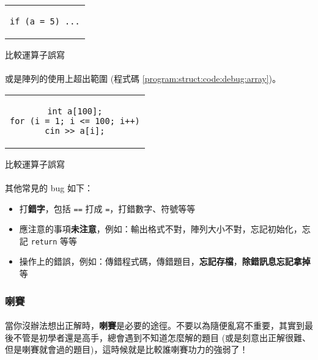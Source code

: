 \documentclass[12pt,a4paper,oneside]{report}
\begin{document}
\begin{CJK}{UTF8}{bkai}
\begin{code}[h!]
\centering
\begin{tabular}{c}
\begin{lstlisting}
if (a = 5) ...
\end{lstlisting}
\end{tabular}
\caption{比較運算子誤寫}
\label{program:struct:code:debug:if}
\end{code}

\paragraph{}或是陣列的使用上超出範圍 (程式碼 \ref{program:struct:code:debug:array})。

\begin{code}[h!]
\centering
\begin{tabular}{c}
\begin{lstlisting}
int a[100];
for (i = 1; i <= 100; i++)
cin >> a[i];
\end{lstlisting}
\end{tabular}
\caption{比較運算子誤寫}
\label{program:struct:code:debug:array}
\end{code}

\paragraph{}其他常見的 bug 如下：

\begin{itemize}
\item 打{\color{red}\textbf{錯字}}，包括 \lstinline!==! 打成 \lstinline!=!，打錯數字、符號等等
\item 應注意的事項{\color{blue}\textbf{未注意}}，例如：輸出格式不對，陣列大小不對，忘記初始化，忘記 \lstinline!return! 等等
\item 操作上的錯誤，例如：傳錯程式碼，傳錯題目，{\color{blue}\textbf{忘記存檔}}，{\color{red}\textbf{除錯訊息忘記拿掉}}等
\end{itemize}

\subsubsection{喇賽}

\paragraph{}當你沒辦法想出正解時，{\color{red}\textbf{喇賽}}是必要的途徑。不要以為隨便亂寫不重要，其實到最後不管是初學者還是高手，總會遇到不知道怎麼解的題目 (或是刻意出正解很難、但是喇賽就會過的題目)，這時候就是比較誰喇賽功力的強弱了！

\end{CJK}
\end{document}
